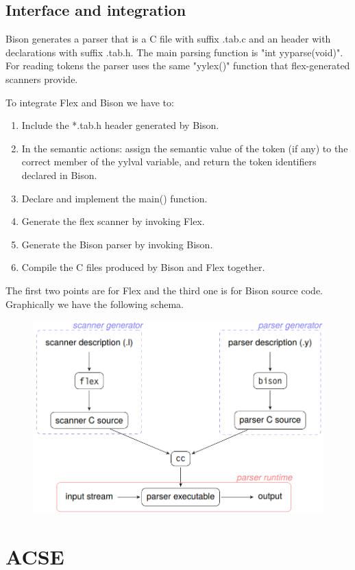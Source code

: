 \documentclass[12pt, a4paper]{report}
\begin{document}
        \subsection{Interface and integration}
        Bison generates a parser that is a C file with suffix .tab.c and an header with declarations with suffix .tab.h. The main parsing function is "int yyparse(void)". 
        For reading tokens the parser uses the same "yylex()" function that flex-generated scanners provide. 

        To integrate Flex and Bison we have to: 
        \begin{enumerate}
            \item Include the *.tab.h header generated by Bison. 
            \item In the semantic actions: assign the semantic value of the token (if any) to the correct member of the yylval variable, and return the token identifiers 
                declared in Bison. 
            \item Declare and implement the main() function. 
            \item Generate the flex scanner by invoking Flex. 
            \item Generate the Bison parser by invoking Bison. 
            \item Compile the C files produced by Bison and Flex together. 
        \end{enumerate}
        The first two points are for Flex and the third one is for Bison source code. Graphically we have the following schema. 
        \begin{figure}[H]
            \centering
            \includegraphics[width=0.8\linewidth]{images/flbi.png}
        \end{figure}







    \section{ACSE}
\end{document}
